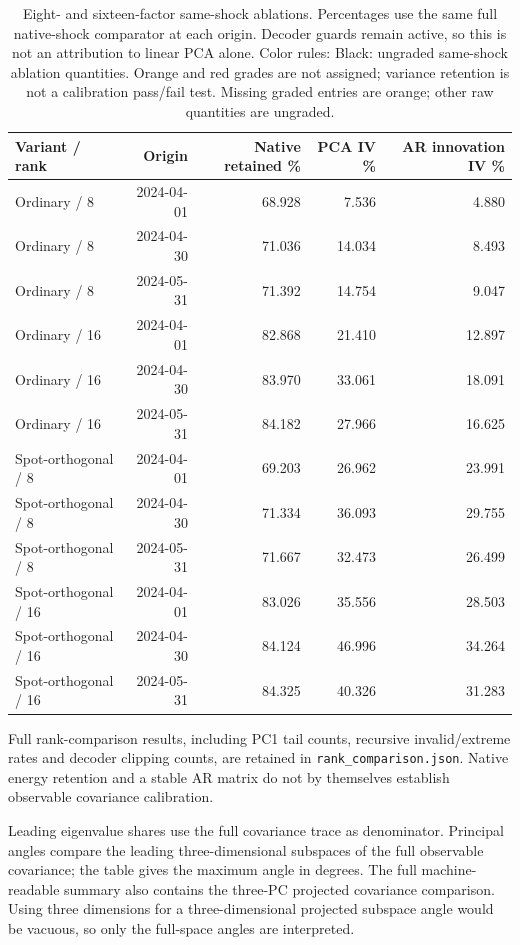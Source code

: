 \documentclass[11pt]{article}
\begin{document}
\begin{table}[H]\centering\small\setlength{\tabcolsep}{4pt}
\caption{Eight- and sixteen-factor same-shock ablations. Percentages use the same full native-shock comparator at each origin. Decoder guards remain active, so this is not an attribution to linear PCA alone. Color rules: Black: ungraded same-shock ablation quantities. Orange and red grades are not assigned; variance retention is not a calibration pass/fail test. Missing graded entries are orange; other raw quantities are ungraded.}\label{tab:rank-reconciliation}
\begin{tabular}{@{}lrrrr@{}}
\toprule
Variant / rank & Origin & Native retained \% & PCA IV \% & AR innovation IV \% \\
\midrule
Ordinary / 8 & 2024-04-01 & 68.928 & 7.536 & 4.880 \\
Ordinary / 8 & 2024-04-30 & 71.036 & 14.034 & 8.493 \\
Ordinary / 8 & 2024-05-31 & 71.392 & 14.754 & 9.047 \\
Ordinary / 16 & 2024-04-01 & 82.868 & 21.410 & 12.897 \\
Ordinary / 16 & 2024-04-30 & 83.970 & 33.061 & 18.091 \\
Ordinary / 16 & 2024-05-31 & 84.182 & 27.966 & 16.625 \\
Spot-orthogonal / 8 & 2024-04-01 & 69.203 & 26.962 & 23.991 \\
Spot-orthogonal / 8 & 2024-04-30 & 71.334 & 36.093 & 29.755 \\
Spot-orthogonal / 8 & 2024-05-31 & 71.667 & 32.473 & 26.499 \\
Spot-orthogonal / 16 & 2024-04-01 & 83.026 & 35.556 & 28.503 \\
Spot-orthogonal / 16 & 2024-04-30 & 84.124 & 46.996 & 34.264 \\
Spot-orthogonal / 16 & 2024-05-31 & 84.325 & 40.326 & 31.283 \\
\bottomrule\end{tabular}\end{table}

Full rank-comparison results, including PC1 tail counts, recursive invalid/extreme rates and decoder clipping counts, are retained in \texttt{rank\_comparison.json}. Native energy retention and a stable AR matrix do not by themselves establish observable covariance calibration.

Leading eigenvalue shares use the full covariance trace as denominator. Principal angles compare the leading three-dimensional subspaces of the full observable covariance; the table gives the maximum angle in degrees. The full machine-readable summary also contains the three-PC projected covariance comparison. Using three dimensions for a three-dimensional projected subspace angle would be vacuous, so only the full-space angles are interpreted.
\end{document}
